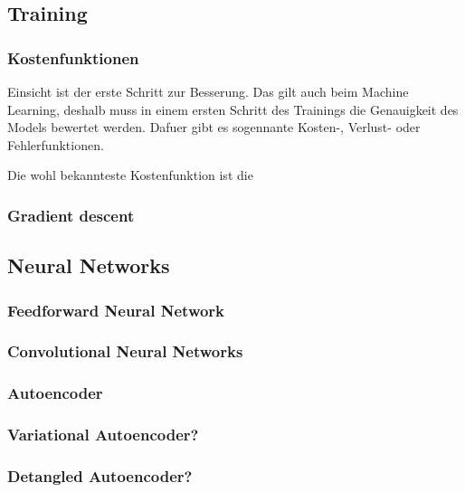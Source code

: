 \documentclass[../main]{subfiles}
\begin{document}
\pagebreak
\subsection{Training}
\subsubsection{Kostenfunktionen}
Einsicht ist der erste Schritt zur Besserung. Das gilt auch beim Machine Learning, deshalb muss in einem ersten Schritt des Trainings die Genauigkeit des Models bewertet werden.
Dafuer gibt es sogennante Kosten-, Verlust- oder Fehlerfunktionen. 

Die wohl bekannteste Kostenfunktion ist die 

\subsubsection{Gradient descent}

\subsection{Neural Networks}
\subsubsection{Feedforward Neural Network}
\subsubsection{Convolutional Neural Networks}
\subsubsection{Autoencoder}
\subsubsection{Variational Autoencoder?}
\subsubsection{Detangled Autoencoder?}
\end{document}

